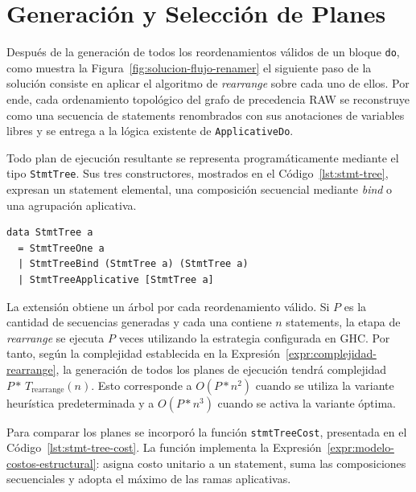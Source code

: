 
\section{Generación y Selección de Planes}
\label{sec:solucion-integracion-applicative-do}

Después de la generación de todos los reordenamientos válidos de un bloque \texttt{do}, como muestra la Figura~\ref{fig:solucion-flujo-renamer} el siguiente paso de la solución consiste en aplicar el algoritmo de \textit{rearrange} sobre cada uno de ellos. Por ende, cada ordenamiento topológico del grafo de precedencia RAW se reconstruye como una secuencia de statements renombrados con sus anotaciones de variables libres y se entrega a la lógica existente de \texttt{ApplicativeDo}.

Todo plan de ejecución resultante se representa programáticamente mediante el tipo \texttt{StmtTree}. Sus tres constructores, mostrados en el Código~\ref{lst:stmt-tree}, expresan un statement elemental, una composición secuencial mediante \textit{bind} o una agrupación aplicativa.

\newpage

\begin{lstlisting}[style=haskell,caption={Representación de los planes de ejecución generados por \textsf{ApplicativeDo}.},label={lst:stmt-tree}]
data StmtTree a
  = StmtTreeOne a
  | StmtTreeBind (StmtTree a) (StmtTree a)
  | StmtTreeApplicative [StmtTree a]
\end{lstlisting}

La extensión obtiene un árbol por cada reordenamiento válido. Si $P$ es la cantidad de secuencias generadas y cada una contiene $n$ statements, la etapa de \textit{rearrange} se ejecuta $P$ veces utilizando la estrategia configurada en \textsf{GHC}. Por tanto, según la complejidad establecida en la Expresión~\ref{expr:complejidad-rearrange}, la generación de todos los planes de ejecución tendrá complejidad $P*\,T_{\mathrm{rearrange}}(n)$. Esto corresponde a $O(P*n^2)$ cuando se utiliza la variante heurística predeterminada y a $O(P*n^3)$ cuando se activa la variante óptima.

Para comparar los planes se incorporó la función \texttt{stmtTreeCost}, presentada en el Código~\ref{lst:stmt-tree-cost}. La función implementa la Expresión~\ref{expr:modelo-costos-estructural}: asigna costo unitario a un statement, suma las composiciones secuenciales y adopta el máximo de las ramas aplicativas.

